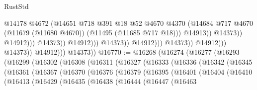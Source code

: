 \begin{lexlean}{RustStd}
\begin{coremodule}
                                                            @14178
                                                            @4672
                                                            (@14651
                                                              @718
                                                              @391
                                                              @18
                                                              @52
                                                              @4670
                                                              @4370
                                                              (@14684
                                                                @717
                                                                @4670
                                                                (@11679 (@11680 @4670))
                                                                (@11495 (@11685 @717 @18)))
                                                              @14913))
                                                          @14373))
                                                      @14912)))
                                                @14373))
                                            @14912)))
                                      @14373))
                                  @14912)))
                            @14373))
                        @14912)))
                  @14373))
              @14912)))
        @14373))
@16770 := @16268
    (@16274
      (@16277
        (@16293
          (@16299
            (@16302
              (@16308
                (@16311
                  (@16327
                    (@16333
                      (@16336
                        (@16342
                          (@16345
                            (@16361
                              (@16367
                                (@16370
                                  (@16376
                                    (@16379
                                      (@16395
                                        (@16401
                                          (@16404
                                            (@16410
                                              (@16413
                                                (@16429
                                                  (@16435
                                                    (@16438
                                                      (@16444
                                                        (@16447
                                                          (@16463

\end{coremodule}
\end{lexlean}
